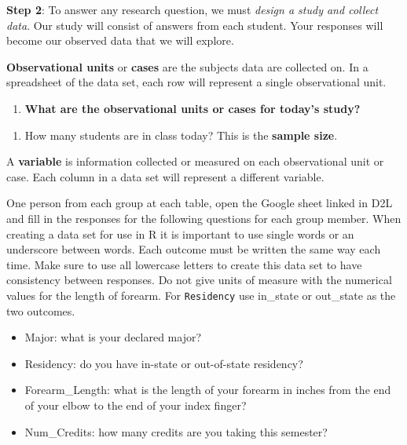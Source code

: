 \documentclass[
]{report}
\providecommand{\tightlist}{%
  \setlength{\itemsep}{0pt}\setlength{\parskip}{0pt}}
\begin{document}
\textbf{Step 2}: To answer any research question, we must \emph{design a study and collect data}. Our study will consist of answers from each student. Your responses will become our observed data that we will explore.

\textbf{Observational units} or \textbf{cases} are the subjects data are collected on. In a spreadsheet of the data set, each row will represent a single observational unit.

\begin{enumerate}
\def\labelenumi{\arabic{enumi}.}
\tightlist
\item
  \textbf{What are the observational units or cases for today's study? }
\end{enumerate}

\vspace{0.2in}

\begin{enumerate}
\def\labelenumi{\arabic{enumi}.}
\setcounter{enumi}{1}
\tightlist
\item
  How many students are in class today? This is the \textbf{sample size}.
\end{enumerate}

\vspace{0.2in}

A \textbf{variable} is information collected or measured on each observational unit or case. Each column in a data set will represent a different variable.

One person from each group at each table, open the Google sheet linked in D2L and fill in the responses for the following questions for each group member. When creating a data set for use in R it is important to use single words or an underscore between words. Each outcome must be written the same way each time. Make sure to use all lowercase letters to create this data set to have consistency between responses. Do not give units of measure with the numerical values for the length of forearm. For \texttt{Residency} use in\_state or out\_state as the two outcomes.

\begin{itemize}
\tightlist
\item
  Major: what is your declared major?
\item
  Residency: do you have in-state or out-of-state residency?
\item
  Forearm\_Length: what is the length of your forearm in inches from the end of your elbow to the end of your index finger?
\item
  Num\_Credits: how many credits are you taking this semester?
\end{itemize}
\end{document}
